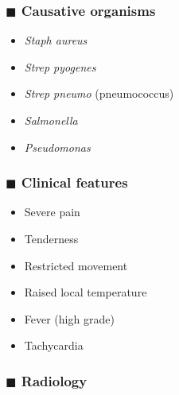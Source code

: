 \documentclass[
  12pt,
]{memoir}
\providecommand{\tightlist}{%
  \setlength{\itemsep}{0pt}\setlength{\parskip}{0pt}}
\begin{document}
\hypertarget{blacksquare-causative-organisms}{%
\subsubsection{\texorpdfstring{\(\blacksquare\) Causative
organisms}{\textbackslash blacksquare Causative organisms}}\label{blacksquare-causative-organisms}}

\begin{itemize}
\tightlist
\item
  \emph{Staph aureus}
\item
  \emph{Strep pyogenes}
\item
  \emph{Strep pneumo} (pneumococcus)
\item
  \emph{Salmonella}
\item
  \emph{Pseudomonas}
\end{itemize}

\hypertarget{blacksquare-clinical-features}{%
\subsubsection{\texorpdfstring{\(\blacksquare\) Clinical
features}{\textbackslash blacksquare Clinical features}}\label{blacksquare-clinical-features}}

\begin{itemize}
\tightlist
\item
  Severe pain
\item
  Tenderness
\item
  Restricted movement
\item
  Raised local temperature
\item
  Fever (high grade)
\item
  Tachycardia
\end{itemize}

\hypertarget{blacksquare-radiology}{%
\subsubsection{\texorpdfstring{\(\blacksquare\)
Radiology}{\textbackslash blacksquare Radiology}}\label{blacksquare-radiology}}
\end{document}
